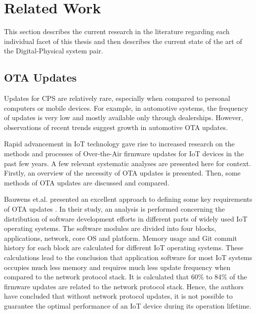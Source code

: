 \section{Related Work}
This section describes the current research in the literature regarding each individual facet of this thesis and then describes the current state of the art of the Digital-Physical system pair.

\subsection{\acrshort{OTA} Updates}
Updates for \acrshort{CPS} are relatively rare, especially when compared to personal computers or mobile devices. For example, in automotive systems, the frequency of updates is very low and mostly available only through dealerships. However, observations of recent trends suggest growth in automotive \acrshort{OTA} updates. 

Rapid advancement in \acrfull{IoT} technology gave rise to increased research on the methods and processes of Over-the-Air firmware updates for \acrshort{IoT} devices in the past few years. A few relevant systematic analyses are presented here for context. Firstly, an overview of the necessity of \acrshort{OTA} updates is presented. Then, some methods of \acrshort{OTA} updates are discussed and compared.

Bauwens et.al. presented an excellent approach to defining some key requirements of \acrshort{OTA} updates \cite{bauwens2020article}. In their study, an analysis is performed concerning the distribution of software development efforts in different parts of widely used \acrshort{IoT} operating systems. The software modules are divided into four blocks, applications, network, core OS and platform. Memory usage and Git commit history for each block are calculated for different \acrshort{IoT} operating systems. These calculations lead to the conclusion that application software for most \acrshort{IoT} systems occupies much less memory and requires much less update frequency when compared to the network protocol stack. It is calculated that 60\% to 84\% of the firmware updates are related to the network protocol stack. Hence, the authors have concluded that without network protocol updates, it is not possible to guarantee the optimal performance of an \acrshort{IoT} device during its operation lifetime.

